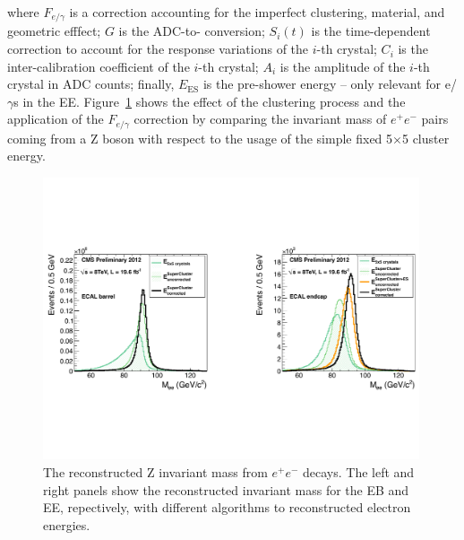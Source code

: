 where $F_{e/\gamma}$ is a correction accounting for the imperfect
clustering, material, and geometric efffect; $G$ is the ADC-to-\GeV
conversion; $S_{i}(t)$ is the time-dependent correction to account for
the response variations of the $i$-th crystal; $C_{i}$ is the
inter-calibration coefficient of the $i$-th crystal; $A_{i}$ is the
amplitude of the $i$-th crystal in ADC counts; finally,
$E_{\mathrm{ES}}$ is the pre-shower energy -- only relevant for
e/$\gamma$s in the EE. Figure~\ref{fig:ECAL_clusterE} shows the effect
of the clustering process and the application of the $F_{e/\gamma}$
correction by comparing the invariant mass of $e^{+}e^{-}$ pairs
coming from a Z boson with respect to the usage of the simple fixed
5$\times$5 cluster energy.

\begin{figure}
 \centering
\includegraphics[width=0.99\textwidth]{CMS_DetectorFigures/ECAL_Zee_Uncorr.pdf}
\caption{The reconstructed Z invariant mass from $e^{+}e^{-}$
  decays. The left and right panels show the reconstructed invariant mass for
  the EB and EE, repectively, with different algorithms to reconstructed electron energies.\label{fig:ECAL_clusterE}}
\end{figure}

